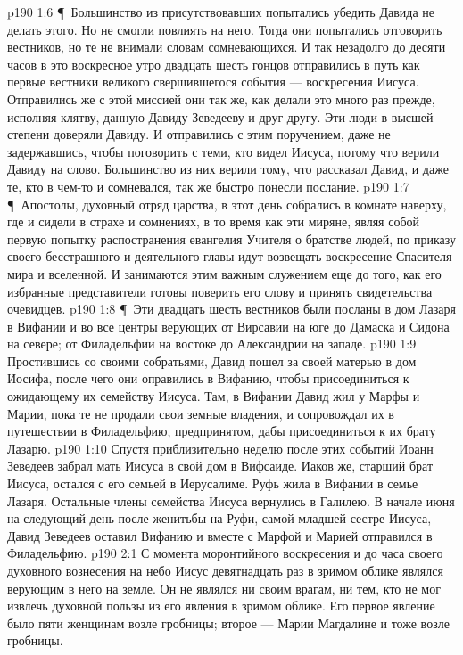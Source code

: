 \vs p190 1:6 \P\ Большинство из присутствовавших попытались убедить Давида не делать этого. Но не смогли повлиять на него. Тогда они попытались отговорить вестников, но те не внимали словам сомневающихся. И так незадолго до десяти часов в это воскресное утро двадцать шесть гонцов отправились в путь как первые вестники великого свершившегося события --- воскресения Иисуса. Отправились же с этой миссией они так же, как делали это много раз прежде, исполняя клятву, данную Давиду Зеведееву и друг другу. Эти люди в высшей степени доверяли Давиду. И отправились с этим поручением, даже не задержавшись, чтобы поговорить с теми, кто видел Иисуса, потому что верили Давиду на слово. Большинство из них верили тому, что рассказал Давид, и даже те, кто в чем\hyp{}то и сомневался, так же быстро понесли послание.
\vs p190 1:7 \P\ Апостолы, духовный отряд царства, в этот день собрались в комнате наверху, где и сидели в страхе и сомнениях, в то время как эти миряне, являя собой первую попытку распостранения евангелия Учителя о братстве людей, по приказу своего бесстрашного и деятельного главы идут возвещать воскресение Спасителя мира и вселенной. И занимаются этим важным служением еще до того, как его избранные представители готовы поверить его слову и принять свидетельства очевидцев.
\vs p190 1:8 \P\ Эти двадцать шесть вестников были посланы в дом Лазаря в Вифании и во все центры верующих от Вирсавии на юге до Дамаска и Сидона на севере; от Филадельфии на востоке до Александрии на западе.
\vs p190 1:9 Простившись со своими собратьями, Давид пошел за своей матерью в дом Иосифа, после чего они оправились в Вифанию, чтобы присоединиться к ожидающему их семейству Иисуса. Там, в Вифании Давид жил у Марфы и Марии, пока те не продали свои земные владения, и сопровождал их в путешествии в Филадельфию, предпринятом, дабы присоединиться к их брату Лазарю.
\vs p190 1:10 Спустя приблизительно неделю после этих событий Иоанн Зеведеев забрал мать Иисуса в свой дом в Вифсаиде. Иаков же, старший брат Иисуса, остался с его семьей в Иерусалиме. Руфь жила в Вифании в семье Лазаря. Остальные члены семейства Иисуса вернулись в Галилею. В начале июня на следующий день после женитьбы на Руфи, самой младшей сестре Иисуса, Давид Зеведеев оставил Вифанию и вместе с Марфой и Марией отправился в Филадельфию.
\vs p190 2:1 С момента моронтийного воскресения и до часа своего духовного вознесения на небо Иисус девятнадцать раз в зримом облике являлся верующим в него на земле. Он не являлся ни своим врагам, ни тем, кто не мог извлечь духовной пользы из его явления в зримом облике. Его первое явление было пяти женщинам возле гробницы; второе --- Марии Магдалине и тоже возле гробницы.

